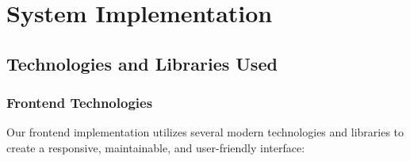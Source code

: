 \chapter{System Implementation}

\section{Technologies and Libraries Used}

\subsection{Frontend Technologies}

Our frontend implementation utilizes several modern technologies and libraries to create a responsive, maintainable, and user-friendly interface:


